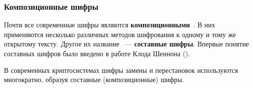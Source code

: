 \subsubsection{Композиционные шифры}

Почти все современные шифры являются \textbf{композиционными}~\cite{AlZKCh:2001}. В них применяются несколько различных методов шифрования к одному и тому же открытому тексту. Другое их название ~--- \textbf{составные шифры}. Впервые понятие составных шифров было введено в работе Клода Шеннона ().

В современных криптосистемах шифры замены и перестановок используются многократно, образуя составные (композиционные) шифры.

